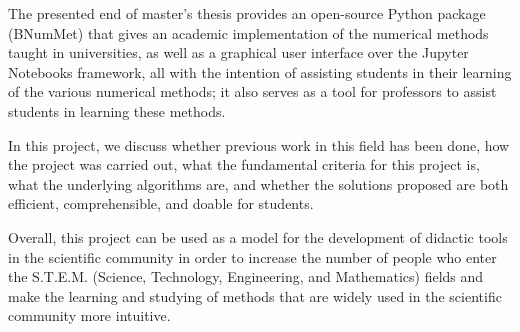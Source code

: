 \newcommand{\KeywordsAbstract}{Numerical methods, Open-source, Python, Jupyter, Software development, Linear systems, Interpolation, Nonlinear, Least squares, Random number generators}

The presented end of master's thesis provides an open-source Python package (BNumMet) that gives an academic implementation of the numerical methods taught in universities, as well as a graphical user interface over the Jupyter Notebooks framework, all with the intention of assisting students in their learning of the various numerical methods; it also serves as a tool for professors to assist students in learning these methods.


In this project, we discuss whether previous work in this field has been done, how the project was carried out, what the fundamental criteria for this project is, what the underlying algorithms are, and whether the solutions proposed are both efficient, comprehensible, and doable for students.

Overall, this project can be used as a model for the development of didactic tools in the scientific community in order to increase the number of people who enter the S.T.E.M. (Science, Technology, Engineering, and Mathematics) fields and make the learning and studying of methods that are widely used in the scientific community more intuitive. 